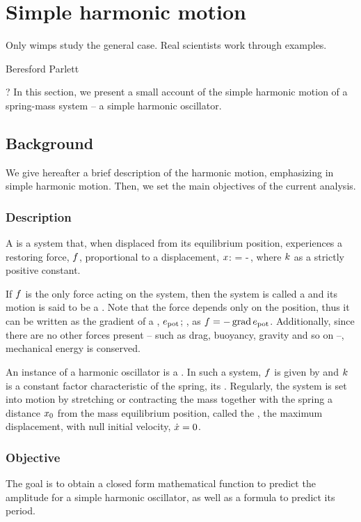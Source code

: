 \section{Simple harmonic motion}
%
\epigraph{Only wimps study the general case. Real scientists work through examples.}{Beresford Parlett}{?}
%
In this section, we present a small account of the simple harmonic motion of a spring-mass system -- a simple harmonic oscillator.


\subsection{Background}
We give hereafter a brief description of the harmonic motion, emphasizing in simple harmonic motion. Then, we set the main objectives of the current analysis.


\subsubsection{Description}
A  is a system that, when displaced from its equilibrium position, experiences a restoring force, $f$, proportional to a displacement, $x$:
\beq
\force = -\kspring\disp\,,
\eeq
where $k$ as a strictly positive constant.

If $f$ is the only force acting on the system, then the system is called a  and its motion is said to be a . Note that the force depends only on the position, thus it can be written as the gradient of a , $e_\text{pot}$; \ie, as $f = -\operatorname{grad}e_\text{pot}$. Additionally, since there are no other forces present -- such as drag, buoyancy, gravity and so on --, mechanical energy is conserved.

An instance of a harmonic oscillator is a . In such a system, $f$ is given by  and $k$ is a constant factor characteristic of the spring, its . Regularly, the system is set into motion by stretching or contracting the mass together with the spring a distance $x_0$ from the mass equilibrium position, called the , the maximum displacement, with null initial velocity, $\dot{x} = 0$.


\subsubsection{Objective}
The goal is to obtain a closed form mathematical function to predict the amplitude for a simple harmonic oscillator, as well as a formula to predict its period.


